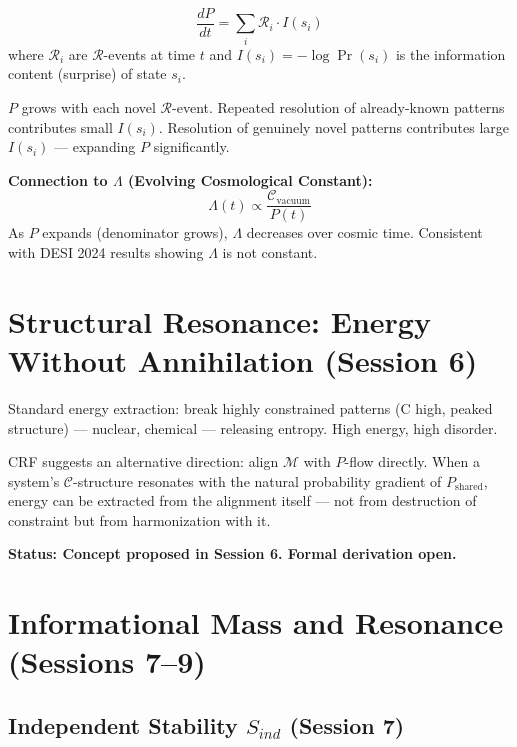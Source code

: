 \documentclass[12pt, a4paper]{article}
\begin{document}
\begin{derivedbox}[title={$P$ Expansion Rate --- Formalized (Session 8)}]
\[
  \frac{dP}{dt} = \sum_i \mathcal{R}_i \cdot I(s_i)
\]
where $\mathcal{R}_i$ are $\mathcal{R}$-events at time $t$ and $I(s_i) = -\log\Pr(s_i)$ is
the information content (surprise) of state $s_i$.

$P$ grows with each novel $\mathcal{R}$-event. Repeated resolution of already-known patterns
contributes small $I(s_i)$. Resolution of genuinely novel patterns contributes large $I(s_i)$
--- expanding $P$ significantly.

\textbf{Connection to $\Lambda$ (Evolving Cosmological Constant):}
\[
  \Lambda(t) \propto \frac{\mathcal{C}_{\mathrm{vacuum}}}{P(t)}
\]
As $P$ expands (denominator grows), $\Lambda$ decreases over cosmic time. Consistent with
DESI 2024 results showing $\Lambda$ is not constant.
\end{derivedbox}

\section{Structural Resonance: Energy Without Annihilation (Session 6)}

\begin{openqbox}[title={Structural Resonance --- Concept Proposed, Not Yet Formalized}]
Standard energy extraction: break highly constrained patterns (C high, peaked structure) ---
nuclear, chemical --- releasing entropy. High energy, high disorder.

CRF suggests an alternative direction: align $\mathcal{M}$ with $P$-flow directly. When a
system's $\mathcal{C}$-structure resonates with the natural probability gradient of
$P_{\mathrm{shared}}$, energy can be extracted from the alignment itself --- not from
destruction of constraint but from harmonization with it.

\textbf{Status: Concept proposed in Session 6. Formal derivation open.}
\end{openqbox}

\section{Informational Mass and Resonance (Sessions 7--9)}

\subsection{Independent Stability $S_{ind}$ (Session 7)}
\end{document}

